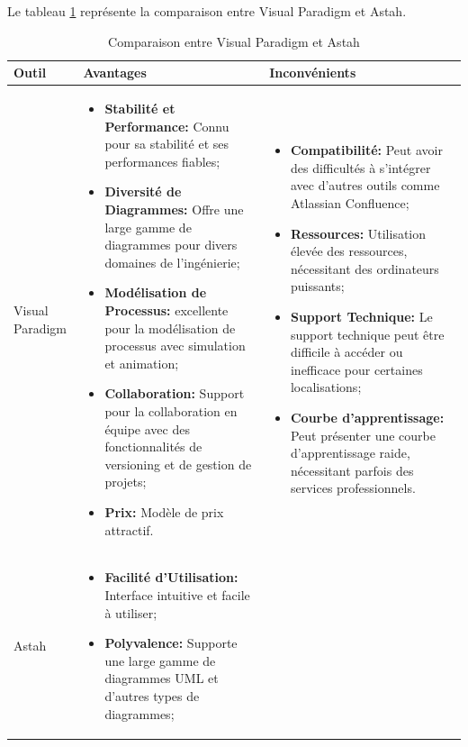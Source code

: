 \documentclass[12pt]{report}
\begin{document}
				Le tableau \ref{tab:outilModelisation} représente la comparaison entre Visual Paradigm et Astah.


				\begin{longtable}{|p{3cm}|p{5.5cm}|p{5.5cm}|} 
						\caption{Comparaison  entre Visual Paradigm et Astah} 
						\label{tab:outilModelisation}\\ 
						\hline 
						\textbf{Outil} & \textbf{Avantages} & \textbf{Inconvénients}\\ 
						\hline 
						\endfirsthead 	
						\endhead
						Visual Paradigm &
						\begin{itemize}
							\item \textbf{Stabilité et Performance:} Connu pour sa stabilité et ses performances fiables;
							\item \textbf{Diversité de Diagrammes:} Offre une large gamme de diagrammes pour divers domaines de l'ingénierie;
							\item \textbf{Modélisation de Processus:} excellente pour la modélisation de processus avec simulation et animation;
							\item \textbf{Collaboration:} Support pour la collaboration en équipe avec des fonctionnalités de versioning et de gestion de projets;
							\item \textbf{Prix:} Modèle de prix attractif.
						\end{itemize} &
						\begin{itemize}
							\item \textbf{Compatibilité:} Peut avoir des difficultés à s'intégrer avec d'autres outils comme Atlassian Confluence;
							\item \textbf{Ressources:} Utilisation élevée des ressources, nécessitant des ordinateurs puissants;
							\item \textbf{Support Technique:} Le support technique peut être difficile à accéder ou inefficace pour certaines localisations;
							\item \textbf{Courbe d'apprentissage:} Peut présenter une courbe d'apprentissage raide, nécessitant parfois des services professionnels.
						\end{itemize}\\
						\hline
						Astah &
						\begin{itemize}
							\item \textbf{Facilité d'Utilisation:} Interface intuitive et facile à utiliser;
							\item \textbf{Polyvalence:} Supporte une large gamme de diagrammes UML et d'autres types de diagrammes;

\end{itemize}
\end{longtable}
\end{document}
